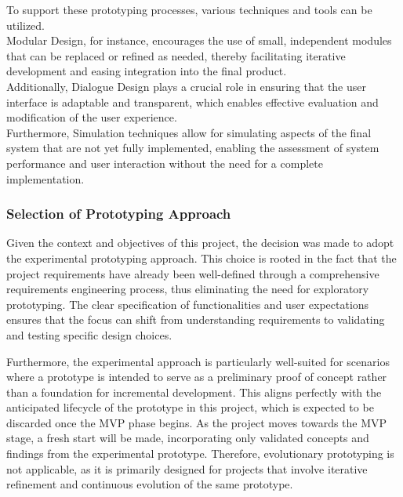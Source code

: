 To support these prototyping processes, various techniques and tools can be utilized.
\autocite[cf.][p.12]{floydSystematicLookPrototyping1984} \\Modular Design, for instance, encourages the use of small,
independent modules that can be replaced or refined as needed, thereby facilitating iterative development and easing
integration into the final product.\autocite[cf.][p.12]{floydSystematicLookPrototyping1984} \\Additionally, Dialogue
Design plays a crucial role in ensuring that the user interface is adaptable and transparent, which enables effective
evaluation and modification of the user experience.\autocite[cf.][p.12]{floydSystematicLookPrototyping1984}
\\Furthermore, Simulation techniques allow for simulating aspects of the final system that are not yet fully
implemented, enabling the assessment of system performance and user interaction without the need for a complete
implementation.\autocite[cf.][p.13]{floydSystematicLookPrototyping1984}

\subsubsection{Selection of Prototyping Approach}\label{subsubsec:ptselection}

Given the context and objectives of this project, the decision was made to adopt the experimental prototyping approach.
This choice is rooted in the fact that the project requirements have already been well-defined through a comprehensive
requirements engineering process, thus eliminating the need for exploratory prototyping. The clear specification of
functionalities and user expectations ensures that the focus can shift from understanding requirements to validating and
testing specific design choices.

Furthermore, the experimental approach is particularly well-suited for scenarios where a prototype is intended to serve
as a preliminary proof of concept rather than a foundation for incremental development. This aligns perfectly with the
anticipated lifecycle of the prototype in this project, which is expected to be discarded once the MVP phase begins. As
the project moves towards the MVP stage, a fresh start will be made, incorporating only validated concepts and findings
from the experimental prototype. Therefore, evolutionary prototyping is not applicable, as it is primarily designed for
projects that involve iterative refinement and continuous evolution of the same prototype.

